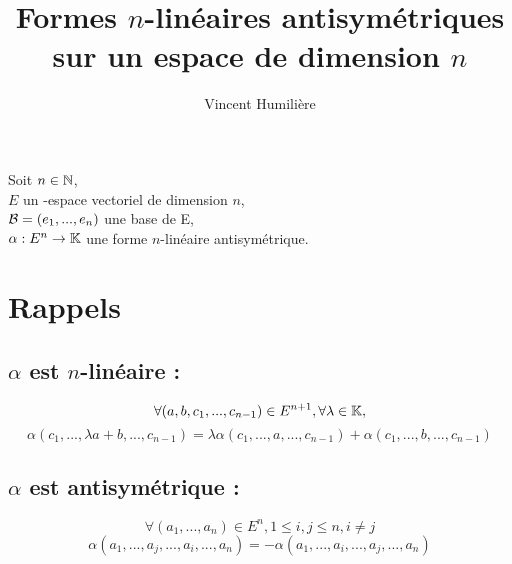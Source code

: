 \documentclass[12pt,a4paper,final]{article}
\author{Vincent Humili\`ere}
\title{Formes $n$-lin\'eaires antisym\'etriques\\sur un espace de dimension $n$}
\begin{document}
	\maketitle
	\noindent
	Soit $n \in \mathbb{N}$, \\
	\phantom{Soit} $E$ un \K -espace vectoriel de dimension $n$, \\
	\phantom{Soit} $\mathcal{B} = (e_1, ..., e_n)$ une base de E, \\
	\phantom{Soit} $\alpha : E^n \to \mathbb{K}$ une forme $n$-lin\'eaire antisym\'etrique.

	\section*{Rappels}
		\subsection*{$\alpha$ est $n$-lin\'eaire :}
			\[ \forall (a, b, c_1, ..., c_{n-1}) \in E^{n+1}, \forall \lambda \in \mathbb{K}, \]
			\[
				\alpha(c_1, ..., \lambda a+b, ..., c_{n-1})
				= \lambda \alpha(c_1, ..., a, ..., c_{n-1})
				+ \alpha(c_1, ..., b, ..., c_{n-1})
			\]
		\subsection*{$\alpha$ est antisym\'etrique :}
			\[ \forall (a_1, ..., a_n) \in E^n, 1 \leqslant i, j \leqslant n, i \neq j\]
			\[ \alpha(a_1, ..., a_j, ..., a_i, ..., a_n) = -\alpha(a_1, ..., a_i, ..., a_j, ..., a_n)\]
\end{document}
